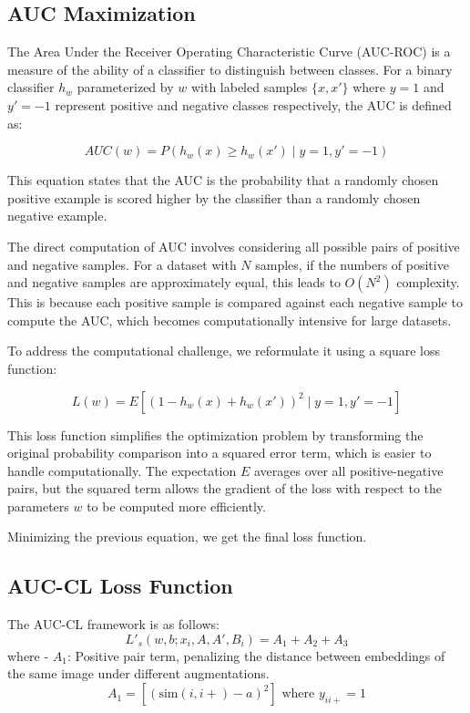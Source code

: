 \subsection{AUC Maximization}
The Area Under the Receiver Operating Characteristic Curve (AUC-ROC) is a measure of the ability of a classifier to distinguish between classes. For a binary classifier \( h_w \) parameterized by \( w \) with labeled samples \( \{x, x'\} \) where \( y = 1 \) and \( y' = -1 \) represent positive and negative classes respectively, the AUC is defined as:

\[
AUC(w) = P(h_w(x) \geq h_w(x') \mid y = 1, y' = -1)
\]

This equation states that the AUC is the probability that a randomly chosen positive example is scored higher by the classifier than a randomly chosen negative example.

The direct computation of AUC involves considering all possible pairs of positive and negative samples. For a dataset with \( N \) samples, if the numbers of positive and negative samples are approximately equal, this leads to \( O(N^2) \) complexity. This is because each positive sample is compared against each negative sample to compute the AUC, which becomes computationally intensive for large datasets.

To address the computational challenge, we reformulate it using a square loss function:

\[
L(w) = E\left[(1 - h_w(x) + h_w(x'))^2 \mid y = 1, y' = -1\right]
\]

This loss function simplifies the optimization problem by transforming the original probability comparison into a squared error term, which is easier to handle computationally. The expectation \( E \) averages over all positive-negative pairs, but the squared term allows the gradient of the loss with respect to the parameters \( w \) to be computed more efficiently. 

Minimizing the previous equation, we get the final loss function.

\subsection{AUC-CL Loss Function}
The AUC-CL framework is as follows:
\[
L'_s(w, b; x_i, A, A', B_i) = A_1 + A_2 + A_3
\]
where
- \(A_1\): Positive pair term, penalizing the distance between embeddings of the same image under different augmentations.
  \[
  A_1 = \left[ (\text{sim}(i, i+) - a)^2 \right] \text{ where } y_{ii+} = 1
  \]

